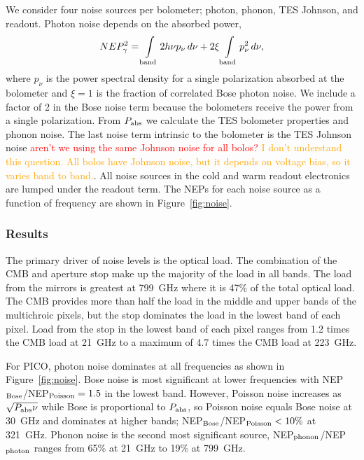\documentclass[]{spie}  %
\newcommand{\comr}[1]{\textcolor{red}{#1}}
\newcommand{\como}[1]{\textcolor{orange}{#1}}
\begin{document}
We consider four noise sources per bolometer; photon, phonon, TES Johnson, and readout. 
Photon noise depends on the absorbed power\cite{richards1994}, 
\begin{equation}
\label{eq:photon}
NEP_{\gamma}^2 = \int\limits_{\rm band} 2h\nu p_{\nu} \, d\nu + 2\xi \int\limits_{\rm band} p_{\nu}^2 \,  d\nu,
\end{equation} 
where $p_{\nu}$ is the power spectral density for a single polarization absorbed at the bolometer and $\xi=1$ is the fraction of correlated Bose 
photon noise. We include a factor of 2 in the Bose noise term because the bolometers receive the power from a single 
polarization. 
From $P_{\rm abs}$ we calculate the TES bolometer properties and phonon noise.\cite{mather1982}  
The last noise term intrinsic to the bolometer is the TES Johnson noise \comr{aren't we using the same
Johnson noise for all bolos?} \como{I don't understand this question.  All bolos have Johnson noise, but it depends on voltage bias, so it varies band to band.}. All noise sources in the cold and warm readout 
electronics are lumped under the readout term.  The NEPs for each noise source as a function 
of frequency are shown in Figure~\ref{fig:noise}.


\subsubsection{Results}  %

The primary driver of noise levels is the optical load.  The combination of the CMB and aperture stop make up the 
majority of the load in all bands. The load from the mirrors is greatest at 799~GHz where it is 47\% of the total 
optical load. The CMB provides more than half the load 
in the middle and upper bands of the multichroic pixels, but the stop dominates the load in the lowest band of each pixel.  
Load from the stop in the lowest band of each pixel ranges from 1.2 times the CMB load at 21~GHz to a maximum of 4.7 
times the CMB load at 223~GHz. 

For PICO, photon noise dominates at all frequencies as shown in Figure~\ref{fig:noise}. Bose noise is most significant 
at lower frequencies with NEP$_{\rm Bose}$/NEP$_{\rm Poisson}= 1.5 $ in the lowest band.  However, Poisson noise increases as 
$\sqrt{P_{\rm abs}\nu}$ while Bose is proportional to $P_{\rm abs}$, so Poisson noise equals Bose noise at 30~GHz and dominates at higher bands; 
NEP$_{\rm Bose}$/NEP$_{\rm Poisson} <10\%$ at 321~GHz. 
Phonon noise is the second most significant source, NEP$_{\rm phonon}$/NEP$_{\rm photon}$ ranges from 65\% at 21~GHz 
to 19\% at 799~GHz. 
\end{document}
